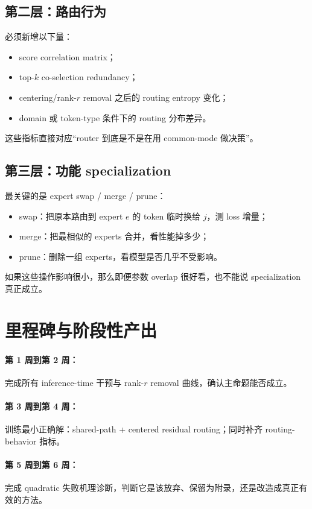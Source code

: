 \documentclass[11pt]{article}
\begin{document}
\subsection{第二层：路由行为}
必须新增以下量：
\begin{itemize}
    \item score correlation matrix；
    \item top-$k$ co-selection redundancy；
    \item centering/rank-$r$ removal 之后的 routing entropy 变化；
    \item domain 或 token-type 条件下的 routing 分布差异。
\end{itemize}
这些指标直接对应“router 到底是不是在用 common-mode 做决策”。

\subsection{第三层：功能 specialization}
最关键的是 expert swap / merge / prune：
\begin{itemize}
    \item swap：把原本路由到 expert $e$ 的 token 临时换给 $j$，测 loss 增量；
    \item merge：把最相似的 experts 合并，看性能掉多少；
    \item prune：删除一组 experts，看模型是否几乎不受影响。
\end{itemize}
如果这些操作影响很小，那么即便参数 overlap 很好看，也不能说 specialization 真正成立。

\section{里程碑与阶段性产出}

\paragraph{第 1 周到第 2 周：} 完成所有 inference-time 干预与 rank-$r$ removal 曲线，确认主命题能否成立。

\paragraph{第 3 周到第 4 周：} 训练最小正确解：shared-path + centered residual routing；同时补齐 routing-behavior 指标。

\paragraph{第 5 周到第 6 周：} 完成 quadratic 失败机理诊断，判断它是该放弃、保留为附录，还是改造成真正有效的方法。
\end{document}
